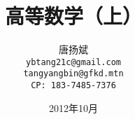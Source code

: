 
\title{高等数学（上）}
\author[NUDT@CS.HN.PRC]{唐扬斌\\
\texttt{\small ybtang21c@gmail.com\\tangyangbin@gfkd.mtn\\CP: 183-7485-7376}}
\date[Autumn 2012]{2012年10月}